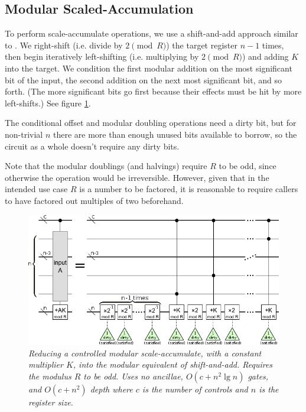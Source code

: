 \documentclass[twocolumn]{article}
\begin{document}
\subsection{Modular Scaled-Accumulation}

To perform scale-accumulate operations, we use a shift-and-add approach similar to \cite{beauregard2003}.
We right-shift (i.e. divide by $2 {\pmod R}$) the target register $n-1$ times, then begin iteratively left-shifting (i.e. multiplying by $2 {\pmod R}$) and adding $K$ into the target.
We condition the first modular addition on the most significant bit of the input, the second addition on the next most significant bit, and so forth.
(The more significant bits go first because their effects must be hit by more left-shifts.)
See figure \ref{fig:controlled-modular-scale-accumulate}.

The conditional offset and modular doubling operations need a dirty bit, but for non-trivial $n$ there are more than enough unused bits available to borrow, so the circuit as a whole doesn't require any dirty bits.

Note that the modular doublings (and halvings) require $R$ to be odd, since otherwise the operation would be irreversible.
However, given that in the intended use case $R$ is a number to be factored, it is reasonable to require callers to have factored out multiples of two beforehand.

\begin{figure}
  \centering
  \includegraphics[width=\linewidth]{assets/controlled-modular-multiply-accumulate.png}
  \caption{\em
    Reducing a controlled modular scale-accumulate, with a constant multiplier $K$, into the modular equivalent of shift-and-add.
    Requires the modulus $R$ to be odd.
    Uses no ancillae, $O(c + n^2 \lg n)$ gates, and $O(c + n^2)$ depth where $c$ is the number of controls and $n$ is the register size.
  }
  \label{fig:controlled-modular-scale-accumulate}
\end{figure}
\end{document}
